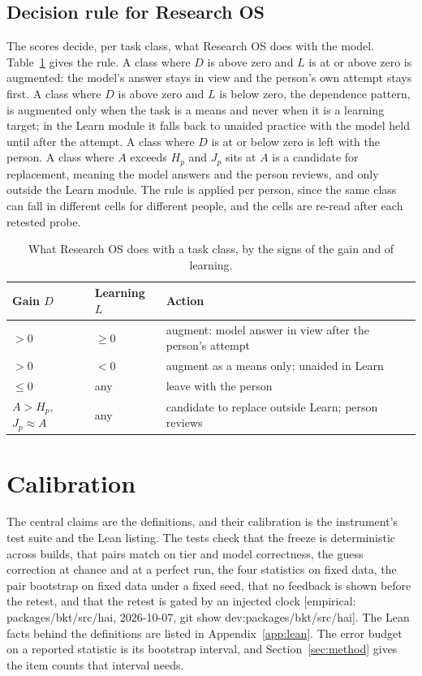 \documentclass[11pt]{article}
\newcommand{\emp}[1]{\textcolor{bucketgray}{\footnotesize [empirical: #1]}}
\newcommand{\hai}{\emp{packages/bkt/src/hai, 2026-10-07, git show dev:packages/bkt/src/hai}}
\begin{document}
\subsection{Decision rule for Research OS}
\label{sec:decision}

The scores decide, per task class, what Research OS does with the model. Table~\ref{tab:decision} gives the rule. A class where $D$ is above zero and $L$ is at or above zero is augmented: the model's answer stays in view and the person's own attempt stays first. A class where $D$ is above zero and $L$ is below zero, the dependence pattern, is augmented only when the task is a means and never when it is a learning target; in the Learn module it falls back to unaided practice with the model held until after the attempt. A class where $D$ is at or below zero is left with the person. A class where $A$ exceeds $H_p$ and $J_p$ sits at $A$ is a candidate for replacement, meaning the model answers and the person reviews, and only outside the Learn module. The rule is applied per person, since the same class can fall in different cells for different people, and the cells are re-read after each retested probe.

\begin{table}[htbp]
  \centering
  \caption{What Research OS does with a task class, by the signs of the gain and of learning.}
  \label{tab:decision}
  \begin{tabular}{@{}lll@{}}
    \toprule
    Gain $D$ & Learning $L$ & Action \\
    \midrule
    $> 0$ & $\geq 0$ & augment: model answer in view after the person's attempt \\
    $> 0$ & $< 0$ & augment as a means only; unaided in Learn \\
    $\leq 0$ & any & leave with the person \\
    $A > H_p$, $J_p \approx A$ & any & candidate to replace outside Learn; person reviews \\
    \bottomrule
  \end{tabular}
\end{table}

\section{Calibration}
\label{sec:calibration}

The central claims are the definitions, and their calibration is the instrument's test suite and the Lean listing. The tests check that the freeze is deterministic across builds, that pairs match on tier and model correctness, the guess correction at chance and at a perfect run, the four statistics on fixed data, the pair bootstrap on fixed data under a fixed seed, that no feedback is shown before the retest, and that the retest is gated by an injected clock \hai. The Lean facts behind the definitions are listed in Appendix~\ref{app:lean}. The error budget on a reported statistic is its bootstrap interval, and Section~\ref{sec:method} gives the item counts that interval needs.
\end{document}

